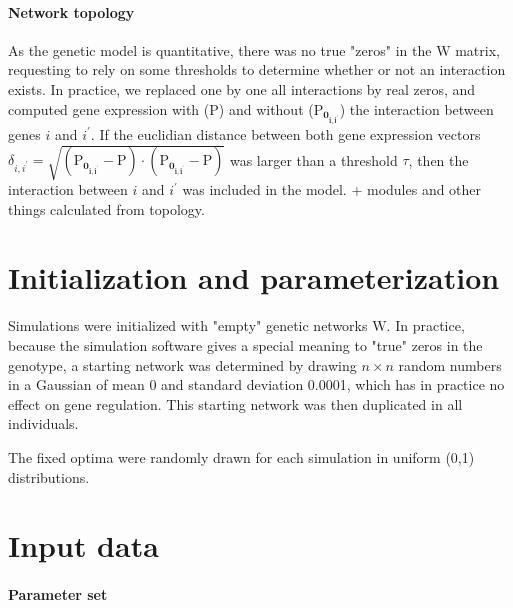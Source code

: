 \documentclass{article}
\begin{document}
\paragraph{Network topology} As the genetic model is quantitative, there was no true "zeros" in the $\bm{\mathrm W}$ matrix, requesting to rely on some thresholds to determine whether or not an interaction exists. In practice, we replaced one by one all interactions by real zeros, and computed gene expression with ($\bm{\mathrm P}$) and without ($\bm{\mathrm P_{0_{i,i^\prime}}}$) the interaction between genes $i$ and $i^\prime$. If the euclidian distance between both gene expression vectors $\delta_{i,i^\prime} = \sqrt{(\bm{\mathrm  P_{0_{i,i^\prime}}} - \bm{\mathrm P}) \cdot (\bm{\mathrm  P_{0_{i,i^\prime}}} - \bm{\mathrm P})}$ was larger than a threshold $\tau$, then the interaction between $i$ and $i^\prime$ was included in the model. + modules and other things calculated from topology. 

\section{Initialization and parameterization}

Simulations were initialized with "empty" genetic networks $\bm{\mathrm W}$. In practice, because the simulation software gives a special meaning to "true" zeros in the genotype, a starting network was determined by drawing $n \times n$ random numbers in a Gaussian of mean 0 and standard deviation 0.0001, which has in practice no effect on gene regulation. This starting network was then duplicated in all individuals. 

The fixed optima were randomly drawn for each simulation in uniform (0,1) distributions. 

\section{Input data}

\paragraph{Parameter set}
\end{document}
